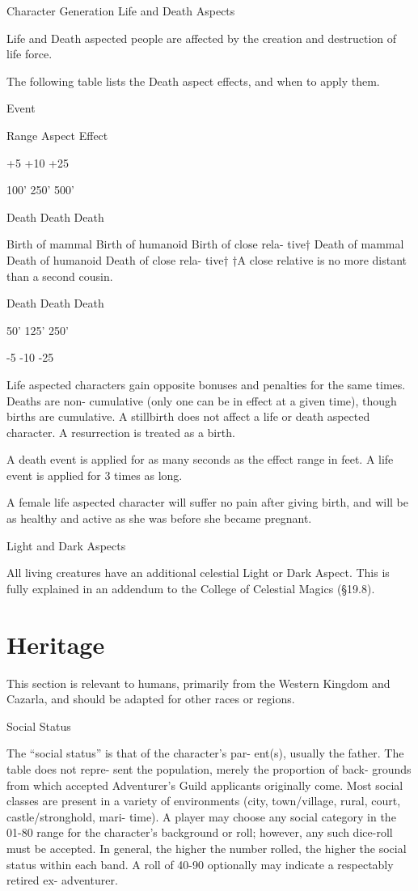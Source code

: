 \begin{Chapter}{Character Generation}
Life and Death Aspects 

Life and Death aspected people are affected by the 
creation and destruction of life force. 

The  following  table  lists  the  Death  aspect  effects, 
and when to apply them. 

Event  

Range  Aspect  Effect 

+5 
+10 
+25 

100’ 
250’ 
500’ 

Death  
Death  
Death  

Birth of mammal  
Birth of humanoid  
Birth of close rela-
tive†  
Death of mammal  
Death of humanoid  
Death of close rela-
tive†  
†A  close  relative  is  no  more  distant  than  a  second 
cousin. 

Death  
Death  
Death  

50’  
125’ 
250’ 

-5 
-10 
-25 

Life aspected characters gain opposite bonuses and 
penalties  for  the  same  times.  Deaths  are  non-
cumulative  (only  one  can  be  in  effect  at  a  given 
time),  though  births  are  cumulative.  A  stillbirth 
does not affect a life or death aspected character. A 
resurrection is treated as a birth. 

A death event is applied for as many seconds as the 
effect  range  in  feet.  A  life  event  is  applied  for  3 
times as long. 

A female life aspected character will suffer no pain 
after giving birth, and will be as healthy and active 
as she was before she became pregnant. 

Light and Dark Aspects 

All  living  creatures  have  an  additional  celestial 
Light or Dark Aspect. This is fully explained in an 
addendum  to  the  College  of  Celestial  Magics 
(§19.8). 

\section{Heritage}

This section is relevant to humans, primarily from the Western Kingdom
and Cazarla, and should be adapted for other races or regions.

Social Status 

The  “social  status”  is  that  of  the  character’s  par-
ent(s), usually the father. The table does not repre-
sent the population, merely the proportion of back-
grounds  from  which  accepted  Adventurer’s  Guild 
applicants originally come. Most social classes are 
present 
in  a  variety  of  environments  (city, 
town/village,  rural,  court,  castle/stronghold,  mari-
time). A player may choose any social category in 
the  01-80  range  for  the  character’s  background  or 
roll; however, any such dice-roll must be accepted. 
In general, the higher the number rolled, the higher 
the social status within each band. A roll of 40-90 
optionally  may  indicate  a  respectably  retired  ex-
adventurer. 


\end{Chapter}
